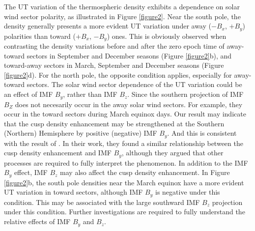 \documentclass[draft, grl]{/home/guod/Documents/template/agu_template/AGUTeX}
\begin{document}
\begin{article}
    The UT variation of the thermospheric density exhibits a dependence on solar
    wind sector polarity, as illustrated in Figure \ref{figure2}. 
    Near the south pole, the density generally presents a more evident UT 
    variation under away ($-B_x$, $+B_y$) polarities than toward ($+B_x$, 
    $-B_y$) ones.
    This is obviously observed when contrasting the density variations before 
    and after the zero epoch time of away-toward sectors in September and 
    December seasons (Figure \ref{figure2}b), and toward-away sectors in March, 
    September and December seasons (Figure \ref{figure2}d).
    For the north pole, the opposite condition applies, especially for 
    away-toward sectors.
    The solar wind sector dependence of the UT variation could be an effect of
    IMF $B_y$, rather than IMF $B_z$. 
    Since the southern projection of IMF $B_Z$ does not necesarily occur in the
    away solar wind sectors.
    For example, they occur in the toward sectors during March equinox days.
    Our result may indicate that the cusp density enhancement may be 
    strengthened at the Southern (Northern) Hemisphere by positive (negative) 
    IMF $B_y$.
    And this is consistent with the result of \citet{Yamazaki2015a}. 
    In their work, they found a similar relationship between the cusp density 
    enhancement and IMF $B_y$, although they argued that other processes are 
    required to fully interpret the phenomenon.
    In addition to the IMF $B_y$ effect, IMF $B_z$ may also affect the cusp 
    density enhancement. 
    In Figure \ref{figure2}b, the south pole densities near the March equinox
    have a more evident UT variation in toward sectors, although IMF $B_y$ is
    negative under this condition. 
    This may be associated with the large southward IMF $B_z$ projection under 
    this condition.
    Further investigations are required to fully understand the relative effects
    of IMF $B_y$ and $B_z$.


\end{article}
\end{document}
